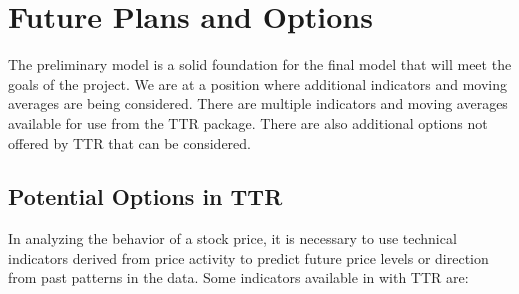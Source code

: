 \documentclass[11pt]{article}
\begin{document}
\section*{\hspace{-.5cm} Future Plans and Options}\label{FP}
The preliminary model is a solid foundation for the final model that will meet the goals of the project. We are at a position where additional indicators and moving averages are being considered. There are multiple indicators and moving averages available for use from the TTR package. There are also additional options not offered by TTR that can be considered.

\subsection*{Potential Options in TTR}\label{PITTR}
In analyzing the behavior of a stock price, it is necessary to use technical indicators derived from price activity to predict future price levels or direction from past patterns in the data. Some indicators available in with TTR are:\textsuperscript{\cite{TTR}}
\end{document}
